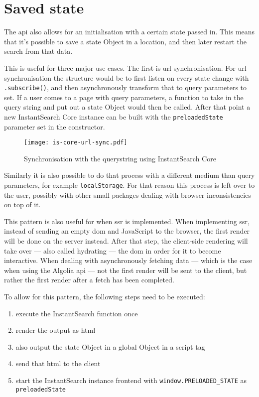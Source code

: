 
\section{Saved state} %
\label{sec:saved_state}

The \acrshort{api} also allows for an initialisation with a certain state passed in. This means that it's possible to save a state Object in a location, and then later restart the search from that data. 

This is useful for three major use cases. The first is \acrfull{url} synchronisation. For \acrshort{url} synchronisation the structure would be to first listen on every state change with {\tt .subscribe()}, and then asynchronously transform that to query parameters to set. If a user comes to a page with query parameters, a function to take in the query string and put out a state Object would then be called. After that point a new InstantSearch Core instance can be built with the {\tt preloadedState} parameter set in the constructor.

\begin{figure}[H]
  \centering
  \texttt{[image: is-core-url-sync.pdf]}
  \caption{Synchronisation with the querystring using InstantSearch Core}
  \label{figure:is-core-url-sync}
\end{figure}

Similarly it is also possible to do that process with a different medium than query parameters, for example {\tt localStorage}. For that reason this process is left over to the user, possibly with other small packages dealing with browser inconsistencies on top of it. 

This pattern is also useful for when \acrfull{ssr} is implemented. When implementing \acrlong{ssr}, instead of sending an empty \acrshort{dom} and JavaScript to the browser, the first render will be done on the server instead. After that step, the client-side rendering will take over --- also called hydrating --- the \acrshort{dom} in order for it to become interactive. When dealing with asynchronously fetching data --- which is the case when using the Algolia \acrshort{api} --- not the first render will be sent to the client, but rather the first render after a fetch has been completed.

To allow for this pattern, the following steps need to be executed:

\begin{enumerate}
  \item execute the InstantSearch function once
  \item render the output as \acrfull{html}
  \item also output the state Object in a global Object in a script tag
  \item send that \acrshort{html} to the client
  \item start the InstantSearch instance frontend with {\tt window.PRELOADED\_STATE} as {\tt preloadedState}
\end{enumerate}

